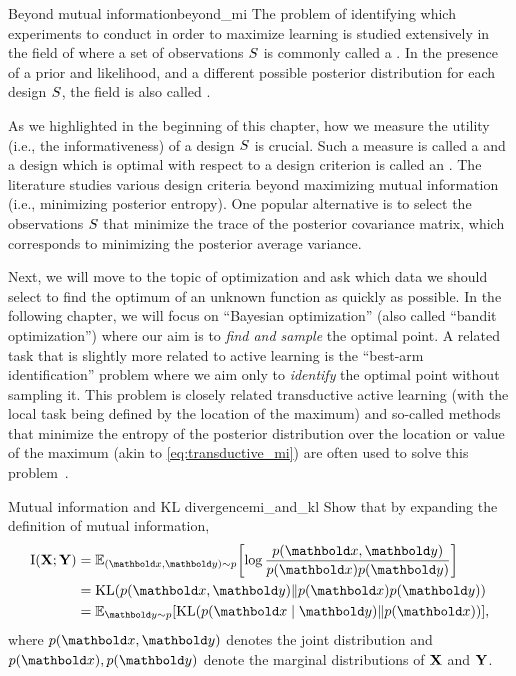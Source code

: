 \begin{rmk}{Beyond mutual information}{beyond_mi}
  The problem of identifying which experiments to conduct in order to maximize learning is studied extensively in the field of  where a set of observations $S$ is commonly called a .
  In the presence of a prior and likelihood, and a different possible posterior distribution for each design $S$, the field is also called  \citep{chaloner1995bayesian,rainforth2024modern,mutny2024modern}.

  As we highlighted in the beginning of this chapter, how we measure the utility (i.e., the informativeness) of a design $S$ is crucial.
  Such a measure is called a  and a design which is optimal with respect to a design criterion is called an .
  The literature studies various design criteria beyond maximizing mutual information (i.e., minimizing posterior entropy).
  One popular alternative is to select the observations $S$ that minimize the trace of the posterior covariance matrix, which corresponds to minimizing the posterior average variance.



\end{rmk}

Next, we will move to the topic of optimization and ask which data we should select to find the optimum of an unknown function as quickly as possible.
In the following chapter, we will focus on ``Bayesian optimization'' (also called ``bandit optimization'') where our aim is to \emph{find and sample} the optimal point.
A related task that is slightly more related to active learning is the ``best-arm identification'' problem where we aim only to \emph{identify} the optimal point without sampling it.
This problem is closely related transductive active learning (with the local task being defined by the location of the maximum) and so-called  methods that minimize the entropy of the posterior distribution over the location or value of the maximum (akin to \cref{eq:transductive_mi}) are often used to solve this problem~\citep{hennig2012entropy,wang2017max,hvarfner2022joint}.


\excheading

\begin{nexercise}{Mutual information and KL divergence}{mi_and_kl}
  Show that by expanding the definition of mutual information, \begin{align}
    \I{\rX}{\rY} &= \E[(\vx,\vy) \sim p]{\log\frac{p(\vx,\vy)}{p(\vx) p(\vy)}} \nonumber \\
    &= \KL{p(\vx,\vy)}{p(\vx) p(\vy)} \\
    &= \E[\vy \sim p]{\KL{p(\vx \mid \vy)}{p(\vx)}},
  \end{align} where $p(\vx,\vy)$ denotes the joint distribution and $p(\vx),p(\vy)$ denote the marginal distributions of $\mathbf{X}$ and $\mathbf{Y}$.
\end{nexercise}

